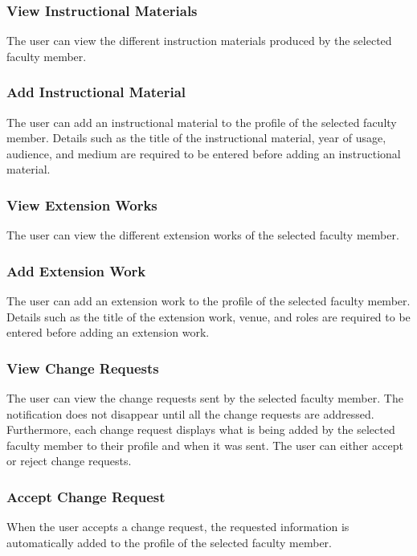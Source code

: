     	\subsubsection{View Instructional Materials}
    	The user can view the different instruction materials produced by the selected faculty member.
    	
    	\subsubsection{Add Instructional Material}
    	The user can add an instructional material to the profile of the selected faculty member. Details such as the title of the instructional material, year of usage, audience, and medium are required to be entered before adding an instructional material.
    	
    	\subsubsection{View Extension Works}
    	The user can view the different extension works of the selected faculty member.
    	
    	\subsubsection{Add Extension Work}
    	The user can add an extension work to the profile of the selected faculty member. Details such as the title of the extension work, venue, and roles are required to be entered before adding an extension work.
    	
    	\subsubsection{View Change Requests}
    	The user can view the change requests sent by the selected faculty member. The notification does not disappear until all the change requests are addressed. Furthermore, each change request displays what is being added by the selected faculty member to their profile and when it was sent. The user can either accept or reject change requests.
    	
    	\subsubsection{Accept Change Request}
    	When the user accepts a change request, the requested information is automatically added to the profile of the selected faculty member.
    	
